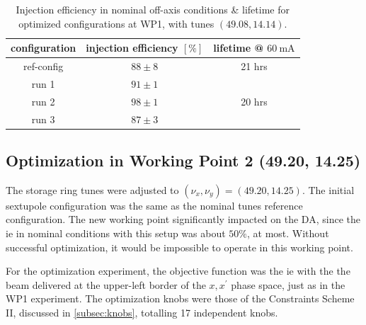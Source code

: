 \begin{table}[htb]
    \centering
    \caption[Injection efficiency in nominal off-axis conditions \& lifetime for optimized configurations at WP1, with tunes $(49.08, 14.14)$.]{Injection efficiency in nominal off-axis conditions \& lifetime for optimized configurations at WP1, with tunes $(49.08, 14.14)$.}
    \begin{tabular}{ccc}
    \hline
    configuration & injection efficiency $[\%]$ & lifetime @ $\unit{60~\milli\ampere}$ \\ \hline
    ref-config    & $88\pm8$                    & 21 hrs    \\
    run 1         & $91\pm1$                    &           \\
    run 2         & $98\pm1$                    &  20 hrs   \\
    run 3         & $87\pm3$                    &           \\ \hline
    \end{tabular}
    \label{tb:wp1summary}
    \end{table}

\subsection{Optimization in Working Point 2 (49.20, 14.25)}
The storage ring tunes were adjusted to $(\nu_x, \nu_y)=(49.20, 14.25)$. The initial sextupole configuration was the same as the nominal tunes reference configuration. The new working point significantly impacted on the \gls*{DA}, since the \gls*{ie} in nominal conditions with this setup was about $50\%$, at most. Without successful optimization, it would be impossible to operate in this working point.

For the optimization experiment, the objective function was the \gls*{ie} with the the beam delivered at the upper-left border of the $x,x^\prime$ phase space, just as in the \gls*{WP1} experiment. The optimization knobs were those of the Constraints Scheme II, discussed in \ref{subsec:knobs}, totalling 17 independent knobs.


